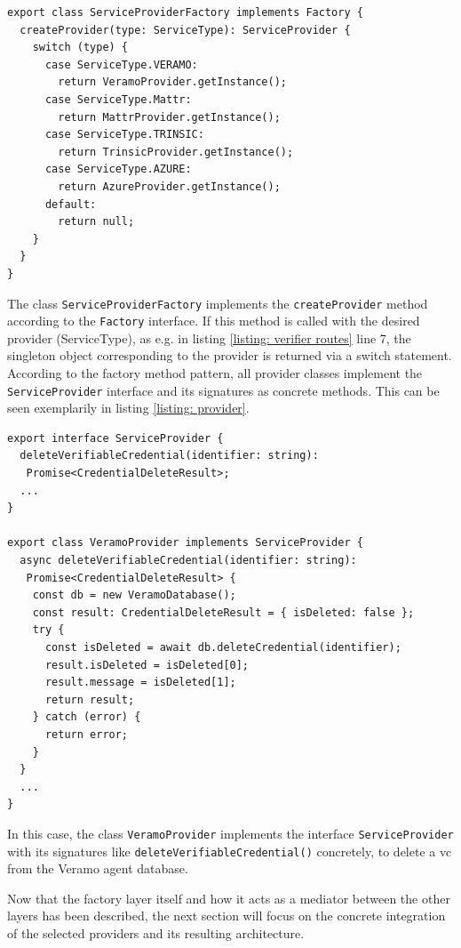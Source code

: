     \begin{lstlisting}[style=ES6, caption=Extract of service provider factory, label={listing: factory}]
export class ServiceProviderFactory implements Factory {
  createProvider(type: ServiceType): ServiceProvider {
    switch (type) {
      case ServiceType.VERAMO:
        return VeramoProvider.getInstance();
      case ServiceType.Mattr:
        return MattrProvider.getInstance();
      case ServiceType.TRINSIC:
        return TrinsicProvider.getInstance();
      case ServiceType.AZURE:
        return AzureProvider.getInstance();
      default:
        return null;
    }
  }
}
\end{lstlisting}

    The class \texttt{ServiceProviderFactory} implements the \texttt{createProvider} method according to the \texttt{Factory} interface. If this method is called with the desired provider (ServiceType), as e.g. in listing \ref{listing: verifier routes} line 7, the singleton object corresponding to the provider is returned via a switch statement. According to the factory method pattern, all provider classes implement the \texttt{ServiceProvider} interface and its signatures as concrete methods. This can be seen exemplarily in listing \ref{listing: provider}.
    \newline

\begin{lstlisting}[style=ES6, caption=Example of provider implementation, label={listing: provider}]
export interface ServiceProvider {
  deleteVerifiableCredential(identifier: string): 
   Promise<CredentialDeleteResult>;
  ...
}

export class VeramoProvider implements ServiceProvider {
  async deleteVerifiableCredential(identifier: string): 
   Promise<CredentialDeleteResult> {
    const db = new VeramoDatabase();
    const result: CredentialDeleteResult = { isDeleted: false };
    try {
      const isDeleted = await db.deleteCredential(identifier);
      result.isDeleted = isDeleted[0];
      result.message = isDeleted[1];
      return result;
    } catch (error) {
      return error;
    }
  }
  ...
}\end{lstlisting}

    In this case, the class \texttt{VeramoProvider} implements the interface \texttt{ServiceProvider} with its signatures like \texttt{deleteVerifiableCredential()} concretely, to delete a \ac{vc} from the Veramo agent database.
    
    Now that the factory layer itself and how it acts as a mediator between the other layers has been described, the next section will focus on the concrete integration of the selected providers and its resulting architecture.
    
